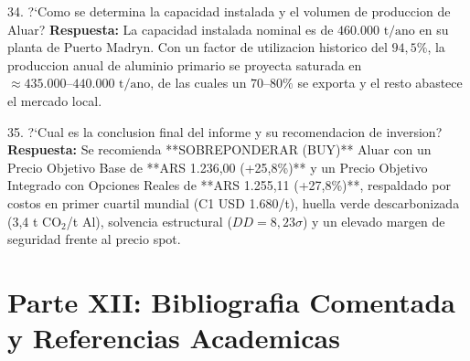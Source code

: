 \documentclass[10pt,a4paper]{article}
\theoremstyle{definition}
\begin{document}
\begin{examquestion}{34. ?`Como se determina la capacidad instalada y el volumen de produccion de Aluar?}
\textbf{Respuesta:} La capacidad instalada nominal es de $460.000\text{ t/ano}$ en su planta de Puerto Madryn. Con un factor de utilizacion historico del $94,5\%$, la produccion anual de aluminio primario se proyecta saturada en $\approx 435.000\text{--}440.000\text{ t/ano}$, de las cuales un $70\text{--}80\%$ se exporta y el resto abastece el mercado local.
\end{examquestion}

\begin{examquestion}{35. ?`Cual es la conclusion final del informe y su recomendacion de inversion?}
\textbf{Respuesta:} Se recomienda **SOBREPONDERAR (BUY)** Aluar con un Precio Objetivo Base de **ARS 1.236,00 (+25,8\%)** y un Precio Objetivo Integrado con Opciones Reales de **ARS 1.255,11 (+27,8\%)**, respaldado por costos en primer cuartil mundial (C1 USD 1.680/t), huella verde descarbonizada (3,4 t $\text{CO}_2$/t Al), solvencia estructural ($DD = 8,23\sigma$) y un elevado margen de seguridad frente al precio spot.
\end{examquestion}
\clearpage


\section{Parte XII: Bibliografia Comentada y Referencias Academicas}
\end{document}
